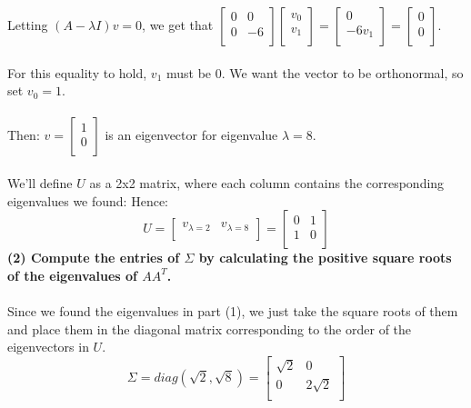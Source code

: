 \documentclass[11pt]{article}
\begin{document}
Letting $(A - \lambda I)v = 0$, we get that $ \begin{bmatrix}
0 & 0 \\
0 & -6 \\
\end{bmatrix} \begin{bmatrix}
v_0 \\
v_1 \\
\end{bmatrix} = \begin{bmatrix}
0 \\
-6v_1 \\
\end{bmatrix} = \begin{bmatrix}
0 \\
0 \\
\end{bmatrix} $. \\\\
For this equality to hold, $v_1$ must be 0. We want the vector to be orthonormal, so set $v_0 =1$. \\\\
Then: $v = \begin{bmatrix}
1 \\
0 \\
\end{bmatrix}$ is an eigenvector for eigenvalue $\lambda = 8$. \\\\
We'll define $U$ as a 2x2 matrix, where each column contains the corresponding eigenvalues we found:
Hence:
$$ \boxed{ U = \begin{bmatrix} 
v_{\lambda = 2} & v_{\lambda = 8} \\
\end{bmatrix} = \begin{bmatrix}
0 & 1 \\
1 & 0 \\
\end{bmatrix}}$$
\textbf{(2) Compute the entries of $\Sigma$ by calculating the positive square roots of the eigenvalues of $AA^T$.}
\\\\
Since we found the eigenvalues in part (1), we just take the square roots of them and place them in the diagonal matrix corresponding to the order of the eigenvectors in $U$.
$$\boxed{\Sigma = diag(\sqrt2, \sqrt8) = \begin{bmatrix}
\sqrt2 & 0 \\
0 & 2 \sqrt2 \\
\end{bmatrix}} $$
\end{document}
